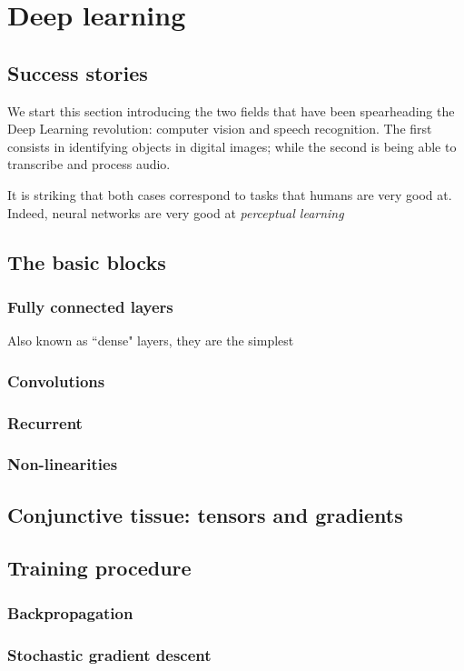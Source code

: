 \chapter{Deep learning}
\section{Success stories}
We start this section introducing the two fields that have been spearheading the Deep Learning revolution: computer vision and speech recognition.
The first consists in identifying objects in digital images; while the second is being able to transcribe and process audio.

It is striking that both cases correspond to tasks that humans are very good at.
Indeed, neural networks are very good at \emph{perceptual learning}

\section{The basic blocks}
\subsection{Fully connected layers}
Also known as ``dense" layers, they are the simplest 

\subsection{Convolutions}
\subsection{Recurrent}
\subsection{Non-linearities}

\section{Conjunctive tissue: tensors and gradients}

\section{Training procedure}
\subsection{Backpropagation}
\subsection{Stochastic gradient descent}

